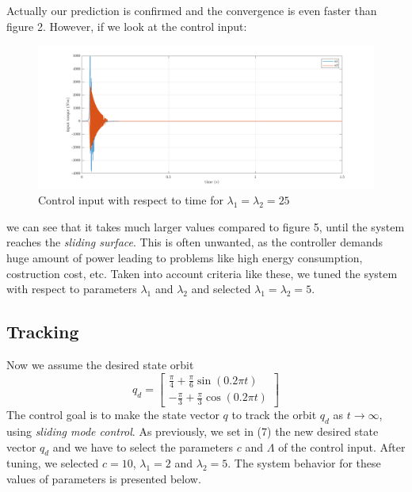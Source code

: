 \documentclass[a4paper]{article}
\begin{document}
\noindent\hspace{-2pt}
Actually our prediction is confirmed and the convergence is even faster than figure 2. However, if we look at the control input: 
\begin{figure}[H]
    \centering
    \includegraphics[width=15cm]{fig/sim1/u25.png}
    \caption{Control input with respect to time for $\lambda_1 = \lambda_2 = 25$}
\end{figure}

\noindent\hspace{-2pt}
we can see that it takes much larger values compared to figure 5, until the system reaches the \textit{sliding surface}. This is often 
unwanted, as the controller demands huge amount of power leading to problems like high energy consumption, costruction cost, etc.
Taken into account criteria like these, we tuned the system with respect to parameters $\lambda_1$ and $ \lambda_2$ and selected 
$\lambda_1 = \lambda_2 = 5$.

\subsection{Tracking}
Now we assume the desired state orbit
$$
    q_d = \begin{bmatrix}
        \frac{\pi}{4} + \frac{\pi}{6} \sin (0.2 \pi t)\\
        -\frac{\pi}{3} + \frac{\pi}{3} \cos (0.2 \pi t)
    \end{bmatrix}
$$
The control goal is to make the state vector $q$ to track the orbit $q_d$ as $t \rightarrow \infty$, 
using \textit{sliding mode control}. As previously, we set in (7) the new desired state vector $q_d$ 
and we have to select the parameters $c$ and $\Lambda$ of the control input. After tuning, we selected 
$c=10$, $\lambda_1 = 2$ and $\lambda_2 = 5$. The system behavior for these values of parameters is presented 
below.
\end{document}
